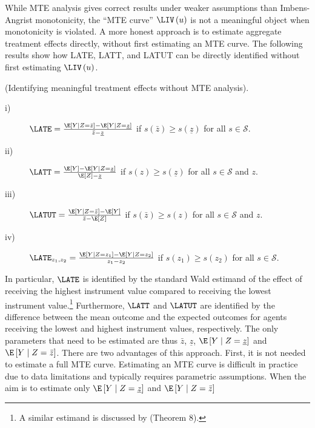 While MTE analysis gives correct results under weaker assumptions
than Imbens-Angrist monotonicity, the ``MTE curve'' $\LIV\left(u\right)$
is not a meaningful object when monotonicity is violated. A more honest
approach is to estimate aggregate treatment effects directly, without
first estimating an MTE curve. The following results show how LATE,
LATT, and LATUT can be directly identified without first estimating
$\LIV\left(u\right)$.
\begin{thm}
\label{thm:id2} (Identifying meaningful treatment effects without
MTE analysis).
\begin{description}
\item [{i)}] $\LATE=\frac{\E\left[Y\mid Z=\bar{z}\right]-\E\left[Y\mid Z=\underline{z}\right]}{\bar{z}-\underline{z}}$
if $s\left(\bar{z}\right)\geq s\left(\underline{z}\right)$ for all
$s\in\mathcal{S}$.
\item [{ii)}] $\LATT=\frac{\E\left[Y\right]-\E\left[Y\mid Z=\underline{z}\right]}{\E\left[Z\right]-\underline{z}}$
if $s\left(z\right)\geq s\left(\underline{z}\right)$ for all $s\in\mathcal{S}$
and $z$.
\item [{iii)}] $\LATUT=\frac{\E\left[Y\mid Z=\bar{z}\right]-\E\left[Y\right]}{\bar{z}-\E\left[Z\right]}$
if $s\left(\bar{z}\right)\geq s\left(z\right)$ for all $s\in\mathcal{S}$
and $z$.
\item [{iv)}] $\LATE_{z_{1},z_{2}}=\frac{\E\left[Y\mid Z=z_{1}\right]-\E\left[Y\mid Z=z_{2}\right]}{z_{1}-z_{2}}$
if $s\left(z_{1}\right)\geq s\left(z_{2}\right)$ for all $s\in\mathcal{S}$.
\end{description}
\end{thm}
In particular, $\LATE$ is identified by the standard Wald estimand
of the effect of receiving the highest instrument value compared to
receiving the lowest instrument value.\footnote{A similar estimand is discussed by \citet{frolich2007nonparametric}
(Theorem 8).} Furthermore, $\LATT$ and $\LATUT$ are identified by the difference
between the mean outcome and the expected outcomes for agents receiving
the lowest and highest instrument values, respectively. The only parameters
that need to be estimated are thus $\bar{z}$, $\underline{z}$, $\E\left[Y\mid Z=\underline{z}\right]$
and $\E\left[Y\mid Z=\bar{z}\right]$. There are two advantages of
this approach. First, it is not needed to estimate a full MTE curve.
Estimating an MTE curve is difficult in practice due to data limitations
and typically requires parametric assumptions. When the aim is to
estimate only $\E\left[Y\mid Z=\underline{z}\right]$ and $\E\left[Y\mid Z=\bar{z}\right]$
